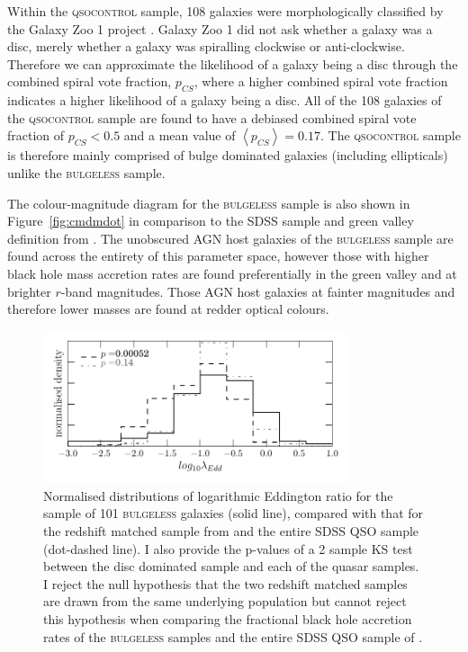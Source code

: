 {Within the \textsc{qsocontrol} sample, 108 galaxies were morphologically classified by the Galaxy Zoo 1 project \cite{lintott08, Lintott11}. Galaxy Zoo 1 did not ask whether a galaxy was a disc, merely whether a galaxy was spiralling clockwise or anti-clockwise. Therefore we can approximate the likelihood of a galaxy being a disc through the combined spiral vote fraction, $p_{CS}$, where a higher combined spiral vote fraction indicates a higher likelihood of a galaxy being a disc. All of the 108 galaxies of the \textsc{qsocontrol} sample are found to have a debiased combined spiral vote fraction  of $p_{CS} < 0.5$ and a mean value of $\left<p_{CS} \right> = 0.17$.  The \textsc{qsocontrol} sample is therefore mainly comprised of bulge dominated galaxies (including ellipticals) unlike the \textsc{bulgeless} sample. %

The colour-magnitude diagram for the \textsc{bulgeless} sample is also shown in Figure~\ref{fig:cmdmdot} in comparison to the SDSS sample and green valley definition from \citet{Baldry04}. The unobscured AGN host galaxies of the \textsc{bulgeless} sample are found across the entirety of this parameter space, however those with higher black hole mass accretion rates are found preferentially in the green valley and at brighter $r$-band magnitudes. Those AGN host galaxies at fainter magnitudes and therefore lower masses are found at redder optical colours.


\begin{figure}
\centering
\includegraphics[width=0.8\textwidth]{agn/edd_ratio_z_matched_shen_2011_compare.pdf}
\caption[Eddington ratio distribution of the \textsc{bulgeless} sample]{Normalised distributions of logarithmic Eddington ratio for the sample of 101 \textsc{bulgeless} galaxies (solid line), compared with that for the redshift matched sample from \citet[][dashed line]{shen11} and the entire SDSS QSO sample (dot-dashed line). I also provide the p-values of a 2 sample KS test between the disc dominated sample and each of the quasar samples. I reject the null hypothesis that the two redshift matched samples are drawn from the same underlying population but cannot reject this hypothesis when comparing the fractional black hole accretion rates of the \textsc{bulgeless} samples and the entire SDSS QSO sample of \citet{shen11}.  
}
\label{fig:eddratioshen}
\end{figure}


}
